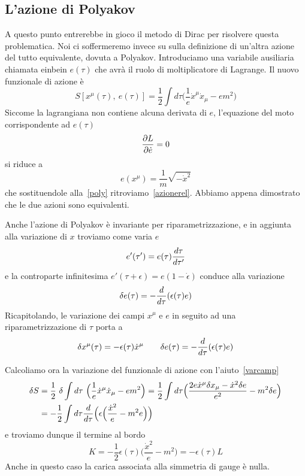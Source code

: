 \subsection{L'azione di Polyakov}
    A questo punto entrerebbe in gioco il metodo di Dirac per risolvere questa problematica. Noi ci soffermeremo invece su sulla definizione di un'altra azione del tutto equivalente, dovuta a Polyakov. Introduciamo una variabile ausiliaria chiamata einbein $e(\tau)$ che avrà il ruolo di moltiplicatore di Lagrange. Il nuovo funzionale di azione è
\begin{equation} \label{poly}
    S[x^\mu(\tau), ~ e(\tau)] = \frac{1}{2} \int d\tau \Big( \frac{1}{e} \dot x^\mu \dot x_\mu - e m^2 \Big)
\end{equation}
    Siccome la lagrangiana non contiene alcuna derivata di $e$, l'equazione del moto corrispondente ad $e(\tau)$ 
\begin{equation*}
    \frac{\partial L}{\partial\dot e} = 0
\end{equation*}
    si riduce a
\begin{equation*}
    e(x^\mu) = \frac{1}{m} \sqrt{-\dot x^2}
\end{equation*}
    che sostituendole alla~\eqref{poly} ritroviamo~\eqref{azionerel}. Abbiamo appena dimostrato che le due azioni sono equivalenti. 

    Anche l'azione di Polyakov è invariante per riparametrizzazione, e in aggiunta alla variazione di $x$ troviamo come varia $e$
\begin{equation*}
    e'(\tau') = e(\tau) \frac{d\tau}{d\tau'}
\end{equation*}
    e la controparte infinitesima $e'(\tau + \epsilon) = e(1 - \dot \epsilon)$ conduce alla variazione
\begin{equation*}
    \delta e(\tau) = - \frac{d}{d\tau} (\epsilon(\tau) e)
\end{equation*}
    Ricapitolando, le variazione dei campi $x^\mu$ e $e$ in seguito ad una riparametrizzazione di $\tau$ porta a 
\begin{equation} \label{varcamp}
    \delta x^\mu(\tau) = - \epsilon(\tau) \dot x^\mu \qquad \delta e(\tau) = - \frac{d}{d\tau} (\epsilon(\tau) e)
\end{equation}

    Calcoliamo ora la variazione del funzionale di azione con l'aiuto~\eqref{varcamp}
\begin{equation*}
\begin{aligned}
    \delta S & = \frac{1}{2} ~ \delta \int d\tau ~ \Big( \frac{1}{e} \dot x^\mu \dot x_\mu - e m^2 \Big) = \frac{1}{2} \int d\tau \Big ( \frac{2 e \dot x^\mu \delta x_\mu - \dot x^2 \delta e}{e^2} - m^2 \delta e \Big) \\ & = -\frac{1}{2} \int d\tau \frac{d}{d\tau} \Big(\epsilon \Big (\frac{\dot x^2}{e} - m^2 e \Big )\Big)
\end{aligned}
\end{equation*}
    e troviamo dunque il termine al bordo  
\begin{equation*}
    K = - \frac{1}{2} \epsilon(\tau) \Big (\frac{\dot x^2}{e} - m^2\Big ) = - \epsilon(\tau) L
\end{equation*}
    Anche in questo caso la carica associata alla simmetria di gauge è nulla.


